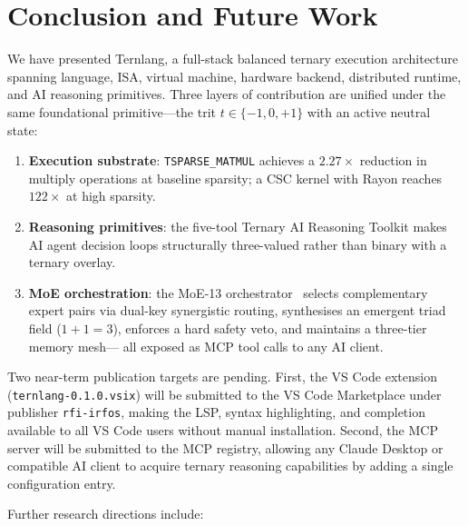 \documentclass[journal,10pt,twocolumn]{IEEEtran}
\begin{document}
\section{Conclusion and Future Work}
\label{sec:conclusion}

We have presented Ternlang, a full-stack balanced ternary execution
architecture spanning language, ISA, virtual machine, hardware backend,
distributed runtime, and AI reasoning primitives. Three layers of
contribution are unified under the same foundational primitive—the trit
$t \in \{-1, 0, +1\}$ with an active neutral state:

\begin{enumerate}
  \item \textbf{Execution substrate}: \texttt{TSPARSE\_MATMUL} achieves a
        $2.27\times$ reduction in multiply operations at baseline sparsity;
        a CSC kernel with Rayon reaches $122\times$ at high sparsity.
  \item \textbf{Reasoning primitives}: the five-tool Ternary AI Reasoning
        Toolkit makes AI agent decision loops structurally three-valued
        rather than binary with a ternary overlay.
  \item \textbf{MoE orchestration}: the MoE-13 orchestrator~\cite{moe13_2026}
        selects complementary expert pairs via dual-key synergistic routing,
        synthesises an emergent triad field ($1{+}1{=}3$), enforces a
        hard safety veto, and maintains a three-tier memory mesh—
        all exposed as MCP tool calls to any AI client.
\end{enumerate}

Two near-term publication targets are pending. First, the VS Code extension
(\texttt{ternlang-0.1.0.vsix}) will be submitted to the VS Code Marketplace
under publisher \texttt{rfi-irfos}, making the LSP, syntax highlighting, and
completion available to all VS Code users without manual installation. Second,
the MCP server will be submitted to the MCP registry, allowing any Claude
Desktop or compatible AI client to acquire ternary reasoning capabilities by
adding a single configuration entry.

Further research directions include:
\end{document}

